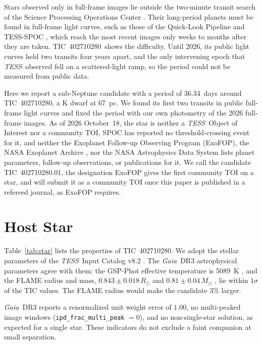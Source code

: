 \documentclass[twocolumn,linenumbers]{aastex701}
\newcommand{\tic}{TIC~402710280}
\newcommand{\planet}{TIC~402710280.01}
\newcommand{\tess}{\textit{TESS}}
\newcommand{\gaia}{\textit{Gaia}}
\newcommand{\rsun}{R_\odot}
\newcommand{\msun}{M_\odot}
\begin{document}
Stars observed only in full-frame images lie outside the two-minute transit search of the Science Processing Operations Center \citep[SPOC;][]{Jenkins2016}. Their long-period planets must be found in full-frame light curves, such as those of the Quick-Look Pipeline \citep[QLP;][]{Huang2020a, Huang2020b} and TESS-SPOC \citep{Caldwell2020}, which reach the most recent images only weeks to months after they are taken. \tic\ shows the difficulty. Until 2026, its public light curves held two transits four years apart, and the only intervening epoch that \tess\ observed fell on a scattered-light ramp, so the period could not be measured from public data.

Here we report a sub-Neptune candidate with a period of 36.34~days around \tic, a K dwarf at 67~pc. We found its first two transits in public full-frame light curves and fixed the period with our own photometry of the 2026 full-frame images. As of 2026 October~18, the star is neither a \tess\ Object of Interest \citep[TOI;][]{Guerrero2021} nor a community TOI, SPOC has reported no threshold-crossing event for it, and neither the Exoplanet Follow-up Observing Program (ExoFOP), the NASA Exoplanet Archive \citep{Akeson2013}, nor the NASA Astrophysics Data System lists planet parameters, follow-up observations, or publications for it. We call the candidate \planet, the designation ExoFOP gives the first community TOI on a star, and will submit it as a community TOI once this paper is published in a refereed journal, as ExoFOP requires.

\section{Host Star} \label{sec:star}

Table~\ref{tab:star} lists the properties of \tic. We adopt the stellar parameters of the \tess\ Input Catalog v8.2 \citep[TIC;][]{Stassun2019}. The \gaia\ DR3 \citep{Gaia2016, GaiaDR3} astrophysical parameters agree with them: the GSP-Phot effective temperature is 5089~K \citep{Andrae2023}, and the FLAME radius and mass, $0.843 \pm 0.018\,\rsun$ and $0.81 \pm 0.04\,\msun$ \citep{Creevey2023}, lie within $1\sigma$ of the TIC values. The FLAME radius would make the candidate 3\% larger.

\gaia\ DR3 reports a renormalized unit weight error \citep[RUWE;][]{Lindegren2021} of $1.00$, no multi-peaked image windows (\texttt{ipd\_frac\_multi\_peak} $= 0$), and no non-single-star solution, as expected for a single star. These indicators do not exclude a faint companion at small separation.
\end{document}

